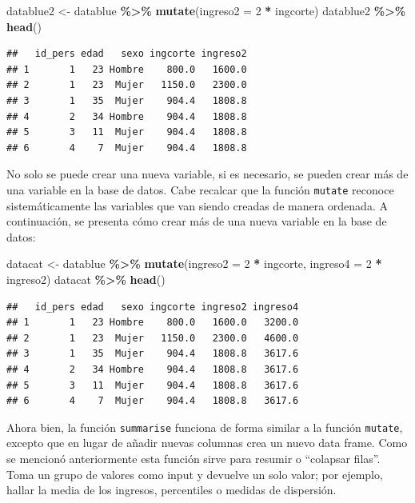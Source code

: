\documentclass[
  12pt,
]{book}
\newenvironment{Shaded}{\begin{snugshade}}{\end{snugshade}}
\newcommand{\AttributeTok}[1]{\textcolor[rgb]{0.13,0.29,0.53}{#1}}
\newcommand{\DecValTok}[1]{\textcolor[rgb]{0.00,0.00,0.81}{#1}}
\newcommand{\FunctionTok}[1]{\textcolor[rgb]{0.13,0.29,0.53}{\textbf{#1}}}
\newcommand{\NormalTok}[1]{#1}
\newcommand{\OtherTok}[1]{\textcolor[rgb]{0.56,0.35,0.01}{#1}}
\newcommand{\SpecialCharTok}[1]{\textcolor[rgb]{0.81,0.36,0.00}{\textbf{#1}}}
\begin{document}
\begin{Shaded}
\begin{Highlighting}[]
\NormalTok{datablue2 }\OtherTok{\textless{}{-}}\NormalTok{ datablue }\SpecialCharTok{\%\textgreater{}\%} 
  \FunctionTok{mutate}\NormalTok{(}\AttributeTok{ingreso2 =} \DecValTok{2} \SpecialCharTok{*}\NormalTok{ ingcorte)}
\NormalTok{datablue2 }\SpecialCharTok{\%\textgreater{}\%} \FunctionTok{head}\NormalTok{()}
\end{Highlighting}
\end{Shaded}

\begin{verbatim}
##   id_pers edad   sexo ingcorte ingreso2
## 1       1   23 Hombre    800.0   1600.0
## 2       1   23  Mujer   1150.0   2300.0
## 3       1   35  Mujer    904.4   1808.8
## 4       2   34 Hombre    904.4   1808.8
## 5       3   11  Mujer    904.4   1808.8
## 6       4    7  Mujer    904.4   1808.8
\end{verbatim}

No solo se puede crear una nueva variable, si es necesario, se pueden crear más de una variable en la base de datos. Cabe recalcar que la función \texttt{mutate} reconoce sistemáticamente las variables que van siendo creadas de manera ordenada. A continuación, se presenta cómo crear más de una nueva variable en la base de datos:

\begin{Shaded}
\begin{Highlighting}[]
\NormalTok{datacat }\OtherTok{\textless{}{-}}\NormalTok{ datablue }\SpecialCharTok{\%\textgreater{}\%} 
  \FunctionTok{mutate}\NormalTok{(}\AttributeTok{ingreso2 =} \DecValTok{2} \SpecialCharTok{*}\NormalTok{ ingcorte,}
         \AttributeTok{ingreso4 =} \DecValTok{2} \SpecialCharTok{*}\NormalTok{ ingreso2)}
\NormalTok{datacat }\SpecialCharTok{\%\textgreater{}\%} \FunctionTok{head}\NormalTok{()}
\end{Highlighting}
\end{Shaded}

\begin{verbatim}
##   id_pers edad   sexo ingcorte ingreso2 ingreso4
## 1       1   23 Hombre    800.0   1600.0   3200.0
## 2       1   23  Mujer   1150.0   2300.0   4600.0
## 3       1   35  Mujer    904.4   1808.8   3617.6
## 4       2   34 Hombre    904.4   1808.8   3617.6
## 5       3   11  Mujer    904.4   1808.8   3617.6
## 6       4    7  Mujer    904.4   1808.8   3617.6
\end{verbatim}

Ahora bien, la función \texttt{summarise} funciona de forma similar a la función \texttt{mutate}, excepto que en lugar de añadir nuevas columnas crea un nuevo data frame. Como se mencionó anteriormente esta función sirve para resumir o ``colapsar filas''. Toma un grupo de valores como input y devuelve un solo valor; por ejemplo, hallar la media de los ingresos, percentiles o medidas de dispersión.
\end{document}
